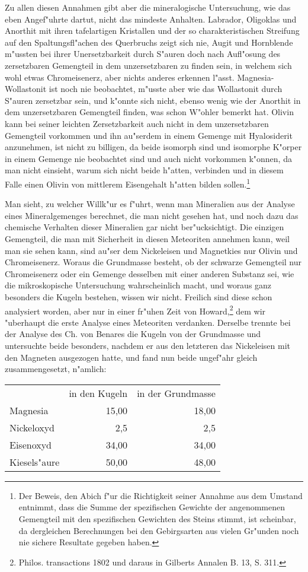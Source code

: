 \documentclass[a4paper, 11pt, oneside, german]{article}
\begin{document}
Zu allen diesen Annahmen gibt aber die mineralogische Untersuchung, wie das eben Angef"uhrte dartut, nicht das mindeste Anhalten. Labrador, Oligoklas und Anorthit mit ihren tafelartigen Kristallen und der so charakteristischen Streifung auf den Spaltungsfl"achen des Querbruchs zeigt sich nie, Augit und Hornblende m"ussten bei ihrer Unersetzbarkeit durch S"auren doch nach Aufl"osung des zersetzbaren Gemengteil in dem unzersetzbaren zu finden sein, in welchem sich wohl etwas Chromeisenerz, aber nichts anderes erkennen l"asst. Magnesia- Wollastonit ist noch nie beobachtet, m"usste aber wie das Wollastonit durch S"auren zersetzbar sein, und k"onnte sich nicht, ebenso wenig wie der Anorthit in dem unzersetzbaren Gemengteil finden, was schon W"ohler bemerkt hat. Olivin kann bei seiner leichten Zersetzbarkeit auch nicht in dem unzersetzbaren Gemengteil vorkommen und ihn au"serdem in einem Gemenge mit Hyalosiderit anzunehmen, ist nicht zu billigen, da beide isomorph sind und isomorphe K"orper in einem Gemenge nie beobachtet sind und auch nicht vorkommen k"onnen, da man nicht einsieht, warum sich nicht beide h"atten, verbinden und in diesem Falle einen Olivin von mittlerem Eisengehalt h"atten bilden sollen.\footnote{Der Beweis, den Abich f"ur die Richtigkeit seiner Annahme aus dem Umstand entnimmt, dass die Summe der spezifischen Gewichte der angenommenen Gemengteil mit den spezifischen Gewichten des Steins stimmt, ist scheinbar, da dergleichen Berechnungen bei den Gebirgsarten aus vielen Gr"unden noch nie sichere Resultate gegeben haben.}

Man sieht, zu welcher Willk"ur es f"uhrt, wenn man Mineralien aus der Analyse eines Mineralgemenges berechnet, die man nicht gesehen hat, und noch dazu das chemische Verhalten dieser Mineralien gar nicht ber"ucksichtigt. Die einzigen Gemengteil, die man mit Sicherheit in diesen Meteoriten annehmen kann, weil man sie sehen kann, sind au"ser dem Nickeleisen und Magnetkies nur Olivin und Chromeisenerz. Woraus die Grundmasse besteht, ob der schwarze Gemengteil nur Chromeisenerz oder ein Gemenge desselben mit einer anderen Substanz sei, wie die mikroskopische Untersuchung wahrscheinlich macht, und woraus ganz besonders die Kugeln bestehen, wissen wir nicht. Freilich sind diese schon analysiert worden, aber nur in einer fr"uhen Zeit von Howard,\footnote{Philos. transactions 1802 und daraus in Gilberts Annalen B. 13, S. 311.} dem wir "uberhaupt die erste Analyse eines Meteoriten verdanken. Derselbe trennte bei der Analyse des Ch. von Benares die Kugeln von der Grundmasse und untersuchte beide besonders, nachdem er aus den letzteren das Nickeleisen mit den Magneten ausgezogen hatte, und fand nun beide ungef"ahr gleich zusammengesetzt, n"amlich:
\begin{center}
\begin{tabular}{ l r r }
     & in den Kugeln & in der Grundmasse\\
    Magnesia & 15,00 & 18,00\\
    Nickeloxyd & 2,5 & 2,5\\
    Eisenoxyd & 34,00 & 34,00\\
    Kiesels"aure & 50,00 & 48,00\\
\end{tabular}
\end{center}
\end{document}

